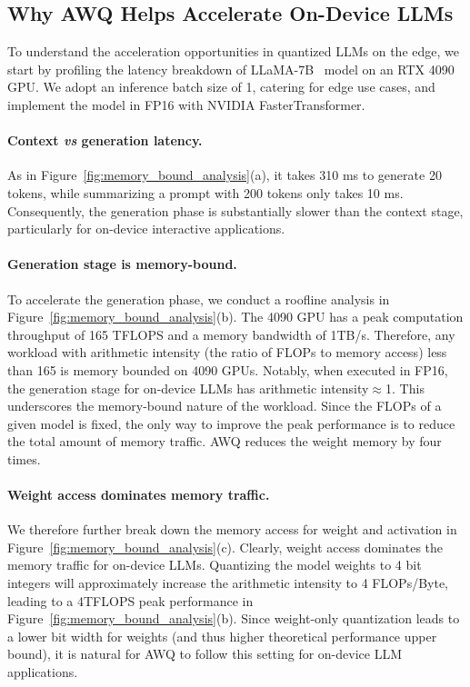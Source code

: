 \subsection{Why AWQ Helps Accelerate On-Device LLMs}

To understand the acceleration opportunities in quantized LLMs on the edge, we start by profiling the latency breakdown of LLaMA-7B~\cite{touvron2023llama} model on an RTX 4090 GPU. We adopt an inference batch size of 1, catering for edge use cases, and implement the model in FP16 with NVIDIA FasterTransformer. 

\paragraph{Context \textit{vs} generation latency.} As in Figure~\ref{fig:memory_bound_analysis}(a), it takes 310 ms to generate 20 tokens, while summarizing a prompt with 200 tokens only takes 10 ms. Consequently, the generation phase is substantially slower than the context stage, particularly for on-device interactive applications. 

\paragraph{Generation stage is memory-bound.} To accelerate the generation phase, we conduct a roofline analysis in Figure~\ref{fig:memory_bound_analysis}(b). The 4090 GPU has a peak computation throughput of 165 TFLOPS and a memory bandwidth of 1TB/s. Therefore, any workload with arithmetic intensity (the ratio of FLOPs to memory access) less than 165 is  memory bounded on 4090 GPUs. Notably, when executed in FP16, the generation stage for on-device LLMs has arithmetic intensity$\approx$1. This underscores the memory-bound nature of the workload. Since the FLOPs of a given model is fixed, the only way to improve the peak performance is to reduce the total amount of memory traffic. AWQ reduces the weight memory by four times. 

\paragraph{Weight access dominates memory traffic.} We therefore further break down the memory access for weight and activation in Figure~\ref{fig:memory_bound_analysis}(c). Clearly, weight access dominates the memory traffic for on-device LLMs. Quantizing the model weights to 4 bit integers will approximately increase the arithmetic intensity to 4 FLOPs/Byte, leading to a 4TFLOPS peak performance in Figure~\ref{fig:memory_bound_analysis}(b). Since weight-only quantization leads to a lower bit width for weights (and thus higher theoretical performance upper bound), it is natural for AWQ to follow this setting for on-device LLM applications.

